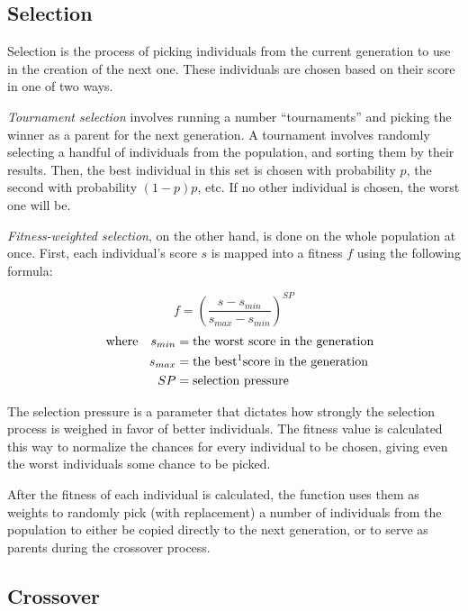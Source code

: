 \documentclass{report}
\begin{document}
\subsection{Selection}

Selection is the process of picking individuals from the current generation to use in the creation of the next one. These individuals are chosen based on their score in one of two ways.

\emph{Tournament selection} involves running a number ``tournaments'' and picking the winner as a parent for the next generation. A tournament involves randomly selecting a handful of individuals from the population, and sorting them by their results. Then, the best individual in this set is chosen with probability $p$, the second with probability $(1-p)p$, etc. If no other individual is chosen, the worst one will be.

\emph{Fitness-weighted selection}, on the other hand, is done on the whole population at once. First, each individual's score $s$ is mapped into a fitness $f$ using the following formula:

$$f = \left(\frac{s - s_{min}}{s_{max} - s_{min}}\right)^{SP}$$
\begin{align*}\quad
    \text{where}\quad
    s_{min} &= \text{the worst score in the generation}\\
    s_{max} &= \text{the best\footnotemark score in the generation}\\
    SP &= \text{selection pressure}
\end{align*}


The selection pressure is a parameter that dictates how strongly the selection process is weighed in favor of better individuals. The fitness value is calculated this way to normalize the chances for every individual to be chosen, giving even the worst individuals some chance to be picked.

After the fitness of each individual is calculated, the function uses them as weights to randomly pick (with replacement) a number of individuals from the population to either be copied directly to the next generation, or to serve as parents during the crossover process.

\subsection{Crossover}
\end{document}
